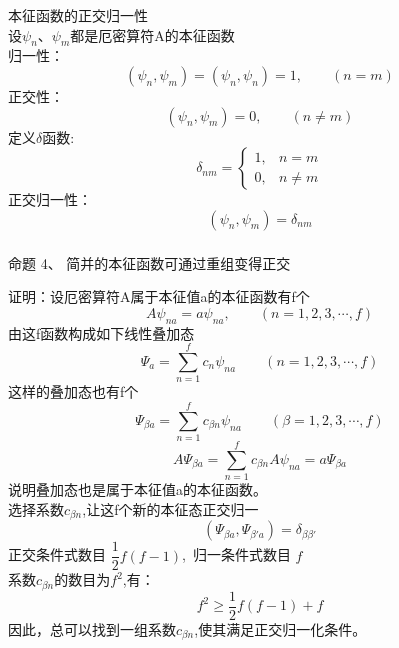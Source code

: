 \begin{frame} [allowframebreaks=]
    \frametitle{}
    \alert{本征函数的正交归一性}\\
    设$\psi_n$、$\psi_m$都是厄密算符A的本征函数\\
    归一性：
    \begin{equation*}
        (\psi_n, \psi_m)=(\psi_n, \psi_n)=1, \qquad (n=m)
    \end{equation*}  
    正交性：
    \begin{equation*}
        (\psi_n, \psi_m)=0, \qquad (n\neq m)
    \end{equation*}
    定义$\delta$函数:
    \begin{equation*}
        \delta_{n m}= 
        \begin{cases}1, & n=m \\ 
            0, & n \neq m
        \end{cases}
        \end{equation*}
    正交归一性：
    \begin{equation*}
        (\psi_n, \psi_m)=\delta_{nm}
    \end{equation*}
\end{frame} 

\begin{frame} [allowframebreaks=]
    \frametitle{}
    \begin{atcbox}{命题 4、}
       简并的本征函数可通过重组变得正交
     \end{atcbox}
    \alert{证明：}设厄密算符A属于本征值a的本征函数有f个
    \begin{equation*}
        A\psi_{na}=a\psi_{na}, \qquad (n=1,2,3,\cdots, f)
    \end{equation*}  
    由这f函数构成如下线性叠加态
    \begin{equation*}
        \Psi_a=\sum_{n=1}^{f} c_n \psi_{na} \qquad (n=1,2,3,\cdots, f)
    \end{equation*}
    这样的叠加态也有f个
    \begin{equation*}
        \Psi_{\beta a}=\sum_{n=1}^{f} c_{\beta n} \psi_{na} \qquad (\beta=1,2,3,\cdots, f)
    \end{equation*}
    \begin{equation*}
        A\Psi_{\beta a}=\sum_{n=1}^{f} c_{\beta n} A\psi_{na} =a \Psi_{\beta a}
    \end{equation*}
   说明叠加态也是属于本征值a的本征函数。\\
   选择系数$c_{\beta n}$,让这f个新的本征态正交归一
   \begin{equation*}
    (\Psi_{\beta a}, \Psi_{\beta' a})=\delta_{\beta\beta'}
    \end{equation*}
    正交条件式数目 $\dfrac{1}{2}f(f-1)$, 归一条件式数目 $f$\\
    系数$c_{\beta n}$的数目为$f^2$,有：$$ f^2\ge \dfrac{1}{2}f(f-1)+f$$
    因此，总可以找到一组系数$c_{\beta n}$,使其满足正交归一化条件。
\end{frame} 

